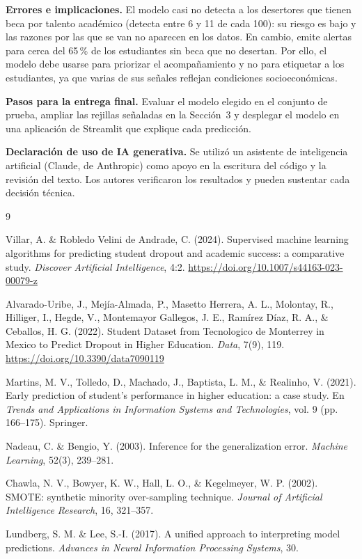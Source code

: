 \documentclass[11pt,a4paper]{article}
\begin{document}
\textbf{Errores e implicaciones.} El modelo casi no detecta a los desertores que tienen beca por talento académico (detecta entre 6 y 11 de cada 100): su riesgo es bajo y las razones por las que se van no aparecen en los datos. En cambio, emite alertas para cerca del 65\,\% de los estudiantes sin beca que no desertan. Por ello, el modelo debe usarse para priorizar el acompañamiento y no para etiquetar a los estudiantes, ya que varias de sus señales reflejan condiciones socioeconómicas.

\textbf{Pasos para la entrega final.} Evaluar el modelo elegido en el conjunto de prueba, ampliar las rejillas señaladas en la Sección~3 y desplegar el modelo en una aplicación de Streamlit que explique cada predicción.

\textbf{Declaración de uso de IA generativa.} Se utilizó un asistente de inteligencia artificial (Claude, de Anthropic) como apoyo en la escritura del código y la revisión del texto. Los autores verificaron los resultados y pueden sustentar cada decisión técnica.

\begin{thebibliography}{9}
\footnotesize
\setlength{\itemsep}{1pt}

Villar, A. \& Robledo Velini de Andrade, C. (2024). Supervised machine learning algorithms for predicting student dropout and academic success: a comparative study. \textit{Discover Artificial Intelligence}, 4:2. \url{https://doi.org/10.1007/s44163-023-00079-z}

Alvarado-Uribe, J., Mejía-Almada, P., Masetto Herrera, A. L., Molontay, R., Hilliger, I., Hegde, V., Montemayor Gallegos, J. E., Ramírez Díaz, R. A., \& Ceballos, H. G. (2022). Student Dataset from Tecnologico de Monterrey in Mexico to Predict Dropout in Higher Education. \textit{Data}, 7(9), 119. \url{https://doi.org/10.3390/data7090119}

Martins, M. V., Tolledo, D., Machado, J., Baptista, L. M., \& Realinho, V. (2021). Early prediction of student's performance in higher education: a case study. En \textit{Trends and Applications in Information Systems and Technologies}, vol. 9 (pp. 166--175). Springer.

Nadeau, C. \& Bengio, Y. (2003). Inference for the generalization error. \textit{Machine Learning}, 52(3), 239--281.

Chawla, N. V., Bowyer, K. W., Hall, L. O., \& Kegelmeyer, W. P. (2002). SMOTE: synthetic minority over-sampling technique. \textit{Journal of Artificial Intelligence Research}, 16, 321--357.

Lundberg, S. M. \& Lee, S.-I. (2017). A unified approach to interpreting model predictions. \textit{Advances in Neural Information Processing Systems}, 30.

\end{thebibliography}
\end{document}
